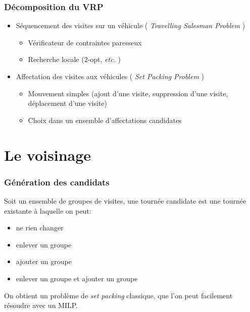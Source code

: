 \documentclass[table]{beamer}
\newcommand*{\foreign}[2][english]{%
    \emph{\foreignlanguage{#1}{#2}}%
}
\begin{document}
\begin{frame}
  \frametitle{Décomposition du VRP}

  \begin{itemize}
  \item Séquencement des visites sur un véhicule (\foreign{Travelling
      Salesman Problem})
    \begin{itemize}
    \item Vérificateur de contraintes paresseux
    \item Recherche locale (2-opt, \foreign{etc.})
    \end{itemize}
  \item Affectation des visites aux véhicules (\foreign{Set Packing Problem})
    \begin{itemize}
    \item Mouvement simples (ajout d'une visite, suppression d'une
      visite, déplacement d'une visite)
    \item Choix dans un ensemble d'affectations candidates
    \end{itemize}
  \end{itemize}
\end{frame}

\section{Le voisinage}

\begin{frame}
  \frametitle{Génération des candidats}

  Soit un ensemble de groupes de visites, une tournée candidate est
  une tournée existante à laquelle on peut:

  \begin{itemize}
  \item ne rien changer
  \item enlever un groupe
  \item ajouter un groupe
  \item enlever un groupe et ajouter un groupe
  \end{itemize}

  On obtient un problème de \foreign{set packing} classique, que l'on peut
  facilement résoudre avec un MILP.
\end{frame}
\end{document}
